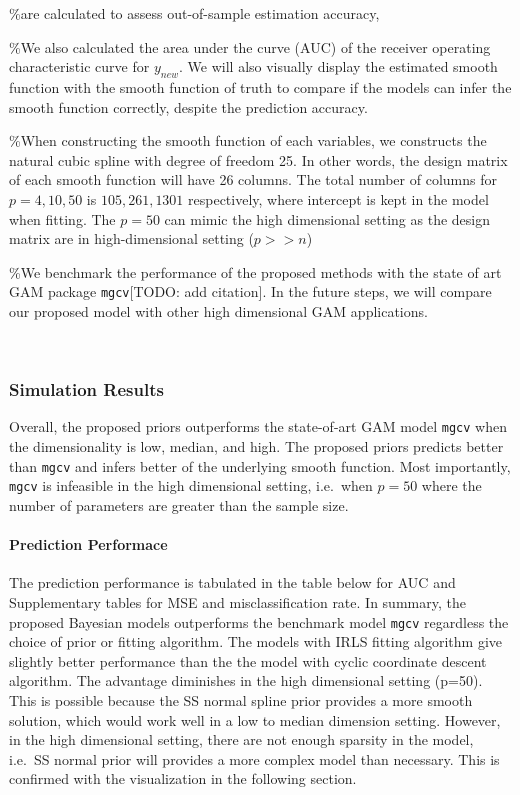 \documentclass[AMA,STIX1COL,]{WileyNJD-v2}
\begin{document}
\%are calculated to assess out-of-sample estimation accuracy,

\%We also calculated the area under the curve (AUC) of the receiver
operating characteristic curve for \(y_{new}\). We will also visually
display the estimated smooth function with the smooth function of truth
to compare if the models can infer the smooth function correctly,
despite the prediction accuracy.

\%When constructing the smooth function of each variables, we constructs
the natural cubic spline with degree of freedom 25. In other words, the
design matrix of each smooth function will have 26 columns. The total
number of columns for \(p=4, 10, 50\) is \(105, 261, 1301\)
respectively, where intercept is kept in the model when fitting. The
\(p=50\) can mimic the high dimensional setting as the design matrix are
in high-dimensional setting (\(p >> n\))

\%We benchmark the performance of the proposed methods with the state of
art GAM package \texttt{mgcv}{[}TODO: add citation{]}. In the future
steps, we will compare our proposed model with other high dimensional
GAM applications.

~

\hypertarget{simulation-results}{%
\subsubsection{Simulation Results}\label{simulation-results}}

Overall, the proposed priors outperforms the state-of-art GAM model
\texttt{mgcv} when the dimensionality is low, median, and high. The
proposed priors predicts better than \texttt{mgcv} and infers better of
the underlying smooth function. Most importantly, \texttt{mgcv} is
infeasible in the high dimensional setting, i.e.~when \(p=50\) where the
number of parameters are greater than the sample size.

\hypertarget{prediction-performace}{%
\paragraph{Prediction Performace}\label{prediction-performace}}

The prediction performance is tabulated in the table below for AUC and
Supplementary tables for MSE and misclassification rate. In summary, the
proposed Bayesian models outperforms the benchmark model \texttt{mgcv}
regardless the choice of prior or fitting algorithm. The models with
IRLS fitting algorithm give slightly better performance than the the
model with cyclic coordinate descent algorithm. The advantage diminishes
in the high dimensional setting (p=50). This is possible because the SS
normal spline prior provides a more smooth solution, which would work
well in a low to median dimension setting. However, in the high
dimensional setting, there are not enough sparsity in the model, i.e.~SS
normal prior will provides a more complex model than necessary. This is
confirmed with the visualization in the following section.
\end{document}
